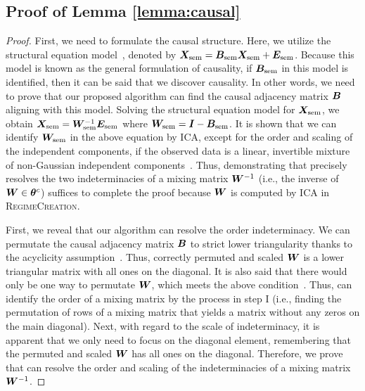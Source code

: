 \subsection{Proof of Lemma \ref{lemma:causal}}
\begin{proof}
First, we need to formulate the causal structure.
Here, we utilize the structural equation model~\cite{pearl2009causality}, denoted by $\bm{X}_{\text{sem}} = \bm{B}_{\text{sem}}\bm{X}_{\text{sem}} + \bm{E}_{\text{sem}}$.
Because this model is known as the general formulation of causality, if $\bm{B}_{\text{sem}}$ in this model is identified, then it can be said that we discover causality.
In other words, we need to prove that our proposed algorithm can find the causal adjacency matrix $\bm{B}$ aligning with this model.
Solving the structural equation model for $\bm{X}_{\text{sem}}$, we obtain 
$\bm{X}_{\text{sem}} = \bm{W}^{-1}_{\text{sem}}\bm{E}_{\text{sem}}$
where $\bm{W}_{\text{sem}} = \bm{I} - \bm{B}_{\text{sem}}$.
It is shown that we can identify $\bm{W}_{\text{sem}}$ in the above equation by ICA,
except for the order and scaling of the independent components, if the observed data is a linear, invertible mixture of non-Gaussian independent components~\cite{comon1994independent}.
Thus, demonstrating that \modelgenerator precisely resolves the two indeterminacies of a mixing matrix $\bm{W}^{-1}$ (i.e., the inverse of $\bm{W} \in \boldsymbol{\theta}^c$) suffices to complete the proof because $\bm{W}$ is computed by ICA in \textsc{RegimeCreation}. \par
First, we reveal that our algorithm can resolve the order indeterminacy.
We can permutate the causal adjacency matrix $\bm{B}$ to strict lower triangularity thanks to the acyclicity assumption~\cite{bollen1989structural}.
Thus, correctly permuted and scaled $\bm{W}$
is a lower triangular matrix with all ones on the diagonal.
It is also said that there would only be one way to permutate $\bm{W}$, which meets the above condition~\cite{shimizu2006linear}.
Thus, \modelgenerator can identify the order of a mixing matrix by the process in step I (i.e., finding the permutation of rows of a mixing matrix that yields a matrix without any zeros on the main diagonal).
Next, with regard to the scale of indeterminacy,
it is apparent that we only need to focus on the diagonal element,
remembering that the permuted and scaled $\bm{W}$ has all ones on the diagonal.
Therefore, we prove that \modelgenerator can resolve the order and scaling of the indeterminacies of a mixing matrix $\bm{W}^{-1}$.
\end{proof}
